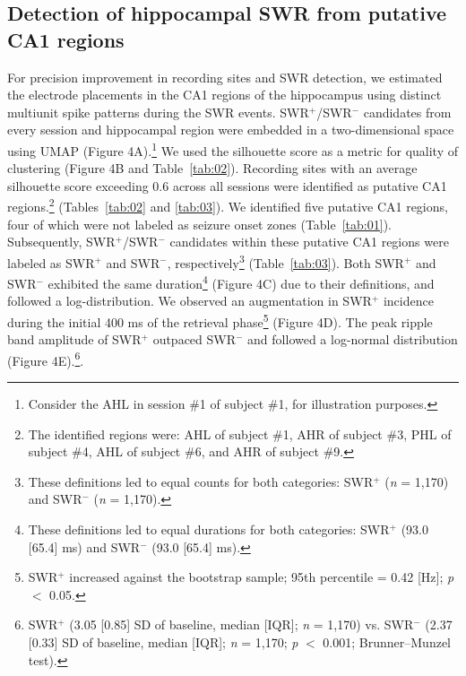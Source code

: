 \documentclass[final,3p,times,twocolumn]{elsarticle}
\begin{document}
\subsection{Detection of hippocampal SWR from putative CA1 regions}
For precision improvement in recording sites and SWR detection, we estimated the electrode placements in the CA1 regions of the hippocampus using distinct multiunit spike patterns during the SWR events. SWR$^+$/SWR$^-$ candidates from every session and hippocampal region were embedded in a two-dimensional space using UMAP (Figure 4A).\footnote{Consider the AHL in session \#1 of subject \#1, for illustration purposes.} We used the silhouette score as a metric for quality of clustering (Figure 4B and Table~\ref{tab:02}). Recording sites with an average silhouette score exceeding 0.6 across all sessions were identified as putative CA1 regions.\footnote{The identified regions were: AHL of subject \#1, AHR of subject \#3, PHL of subject \#4, AHL of subject \#6, and AHR of subject \#9.} (Tables~\ref{tab:02} and \ref{tab:03}). We identified five putative CA1 regions, four of which were not labeled as seizure onset zones (Table~\ref{tab:01}).
\\
\indent
Subsequently, SWR$^+$/SWR$^-$ candidates within these putative CA1 regions were labeled as SWR$^+$ and SWR$^-$, respectively\footnote{These definitions led to equal counts for both categories: SWR$^+$ (\textit{n} = 1,170) and SWR$^-$ (\textit{n} = 1,170).}  (Table~\ref{tab:03}). Both SWR$^+$ and SWR$^-$ exhibited the same duration\footnote{These definitions led to equal durations for both categories: SWR$^+$ (93.0 [65.4] ms) and SWR$^-$ (93.0 [65.4] ms).}  (Figure 4C) due to their definitions, and followed a log-distribution. We observed an augmentation in SWR$^+$ incidence during the initial 400 ms of the retrieval phase\footnote{SWR$^+$ increased against the bootstrap sample; 95th percentile = 0.42 [Hz]; \textit{p} $<$ 0.05.}  (Figure 4D). The peak ripple band amplitude of SWR$^+$ outpaced SWR$^-$ and followed a log-normal distribution (Figure 4E).\footnote{SWR$^+$ (3.05 [0.85] SD of baseline, median [IQR]; \textit{n} = 1,170) vs. SWR$^-$ (2.37 [0.33] SD of baseline, median [IQR]; \textit{n} = 1,170; \textit{p} $<$ 0.001; Brunner--Munzel test).}.
\end{document}
